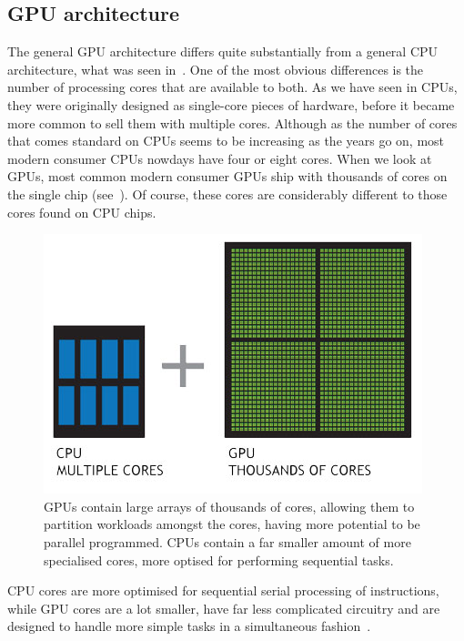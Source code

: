 \documentclass[a4paper,11pt]{article}
\begin{document}
\subsection{GPU architecture} %
\label{sub:gpu_architecture}
The general GPU architecture differs quite substantially from a general CPU architecture, what was seen
in~. One of the most obvious differences is the number of processing cores
that are available to both. As we have seen in CPUs, they were originally designed as single-core pieces of hardware,
before it became more common to sell them with multiple cores. Although as the number of cores that comes standard on
CPUs seems to be increasing as the years go on, most modern consumer CPUs nowdays have four or eight cores. When we
look at GPUs, most common modern consumer GPUs ship with thousands of cores on the single chip (see~).
Of course, these cores are considerably different to those cores found on CPU chips.

\begin{figure}[ht]
  \centering
  \includegraphics[scale=0.5]{img/cpu-and-gpu}
  \caption{GPUs contain large arrays of thousands of cores, allowing them to partition workloads amongst the cores,
  having more potential to be parallel programmed. CPUs contain a far smaller amount of more specialised cores, more
  optised for performing sequential tasks.~\cite{web:NvidiaCPUvsGPU}}
\label{fig:gpu-vs-cpu}
\end{figure}

CPU cores are more optimised for sequential serial processing of instructions, while GPU cores are a lot smaller, have
far less complicated circuitry and are designed to handle more simple tasks in a simultaneous fashion~\cite{web:NvidiaGPUComputing}.
\end{document}

